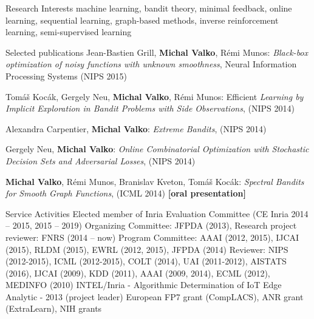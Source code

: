 \documentclass{resume}
\begin{document}

\begin{category}{Research Interests}
\citemnobullet machine learning, bandit theory, minimal feedback, 
online learning, sequential learning, graph-based methods, inverse 
reinforcement learning, semi-supervised learning
\end{category}


\begin{category}{Selected publications }
\citembullet
Jean-Bastien Grill, {\bf Michal Valko}, R\' emi Munos:
\emph{Black-box optimization of noisy functions with unknown smoothness},
Neural Information Processing Systems
({\sf NIPS 2015}) 


\citembullet
Tom\'a\v s Koc\' ak, Gergely Neu, {\bf Michal Valko}, R\' emi Munos: Efficient 
\emph{Learning by Implicit Exploration in Bandit Problems with Side 
Observations}, ({\sf NIPS 2014})

\citembullet
Alexandra Carpentier, {\bf Michal Valko}: \emph{Extreme Bandits},
({\sf NIPS 2014})

\citembullet
Gergely Neu, {\bf Michal Valko}: \emph{Online Combinatorial Optimization with 
Stochastic Decision Sets and Adversarial Losses},  ({\sf NIPS 2014})

\citembullet
{\bf Michal Valko}, R\' emi Munos, Branislav Kveton, Tom\'a\v s Koc\' ak:
\emph{Spectral Bandits for Smooth Graph Functions},
({\sf ICML 2014})  {\bf [oral presentation]}


\end{category}

\begin{category}{Service Activities}
\citembullet Elected member of Inria Evaluation Committee (CE Inria 2014 -- 2015, 2015 -- 2019)
\citembullet Organizing Committee: JFPDA (2013),  Research project reviewer: FNRS (2014 -- now)
\citembullet Program Committee: AAAI (2012, 2015), IJCAI (2015), RLDM (2015), EWRL 
(2012, 2015), JFPDA (2014)
\citembullet  Reviewer: NIPS (2012-2015), ICML (2012-2015), COLT
(2014), UAI (2011-2012), AISTATS (2016), IJCAI (2009), KDD (2011), AAAI (2009, 2014), ECML
(2012), MEDINFO (2010)
\citembullet INTEL/Inria - Algorithmic Determination of IoT Edge Analytic -
2013 (project leader)
\citembullet  European FP7 grant (CompLACS), ANR grant (ExtraLearn), NIH grants
\end{category}
\end{document}
